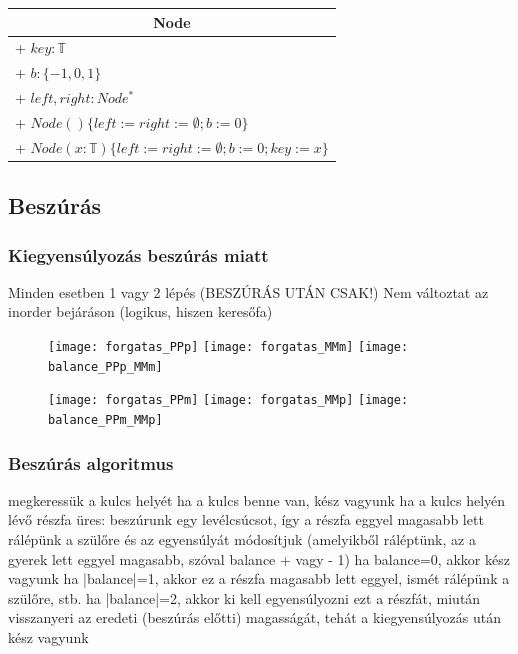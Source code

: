 \documentclass[12pt,a4paper]{article}
\begin{document}
\begin{table}[h!]
	\centering
	\begin{tabular}{|l|}
		\hline
		\multicolumn{1}{|c|}{Node} \\
		\hline
		+ $key : \mathbb{T}$ \\
		+ $b : \{-1,0,1\}$ \\
		+ $left, right : Node^*$ \\
		\hline
		+ $Node() \{left:=right:=\emptyset ; b:=0\}$ \\
		+ $Node(x:\mathbb{T}) \{left:=right:=\emptyset ; b:=0 ; key := x\}$ \\
		\hline
	\end{tabular}
\end{table}

\pagebreak

\subsection{Beszúrás}

\subsubsection{Kiegyensúlyozás beszúrás miatt}

\begin{outline}
	\1 Minden esetben 1 vagy 2 lépés (BESZÚRÁS UTÁN CSAK!)
	\1 Nem változtat az inorder bejáráson (logikus, hiszen keresőfa)
\end{outline}

\begin{figure}[h!]
	\centering
	\texttt{[image: forgatas\_PPp]}
	\texttt{[image: forgatas\_MMm]}
	\texttt{[image: balance\_PPp\_MMm]}
\end{figure}

\begin{figure}[p]
	\centering
	\texttt{[image: forgatas\_PPm]}
	\texttt{[image: forgatas\_MMp]}
	\texttt{[image: balance\_PPm\_MMp]}
\end{figure}

\pagebreak

\subsubsection{Beszúrás algoritmus}

\begin{outline}
	\1 megkeressük a kulcs helyét
		\2 ha a kulcs benne van, kész vagyunk
		\2 ha a kulcs helyén lévő részfa üres: beszúrunk egy levélcsúcsot, így a részfa eggyel magasabb lett
	\1 rálépünk a szülőre és az egyensúlyát módosítjuk (amelyikből ráléptünk, az a gyerek lett eggyel magasabb, szóval balance + vagy - 1)
		\2 ha balance=0, akkor kész vagyunk
		\2 ha |balance|=1, akkor ez a részfa magasabb lett eggyel, ismét rálépünk a szülőre, stb.
		\2 ha |balance|=2, akkor ki kell egyensúlyozni ezt a részfát, miután visszanyeri az eredeti (beszúrás előtti) magasságát, tehát a kiegyensúlyozás után kész vagyunk
\end{outline}
\end{document}
